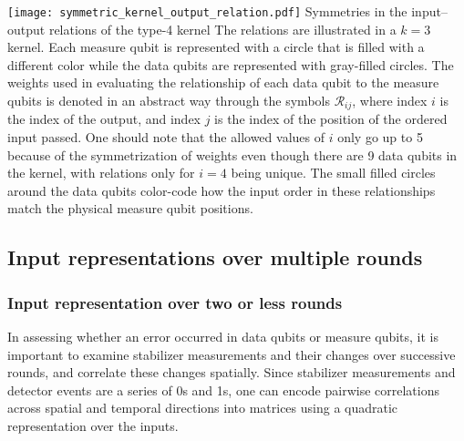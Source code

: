 \begin{figure*}[htb]
\centering
\texttt{[image: symmetric\_kernel\_output\_relation.pdf]}
\ccaption
{Symmetries in the input--output relations of the type-4 kernel}
{
The relations are illustrated in a $k=3$ kernel. Each measure qubit is represented with a circle that is filled with a different color while the data qubits are represented with gray-filled circles. The weights used in evaluating the relationship of each data qubit to the measure qubits is denoted in an abstract way through the symbols $\mathcal{R}_{ij}$, where index $i$ is the index of the output, and index $j$ is the index of the position of the ordered input passed. One should note that the allowed values of $i$ only go up to 5 because of the symmetrization of weights even though there are 9 data qubits in the kernel, with relations only for $i=4$ being unique. The small filled circles around the data qubits color-code how the input order in these relationships match the physical measure qubit positions.
}
\label{fig:t4kernslsym}
\end{figure*}

\subsection{Input representations over multiple rounds}
\subsubsection{Input representation over two or less rounds}
\label{sec:kernels-r2}

In assessing whether an error occurred in data qubits or measure qubits, it is important to examine stabilizer measurements and their changes over successive rounds, and correlate these changes spatially.
Since stabilizer measurements and detector events are a series of 0s and 1s, one can encode pairwise correlations across spatial and temporal directions into matrices using a quadratic representation over the inputs.

